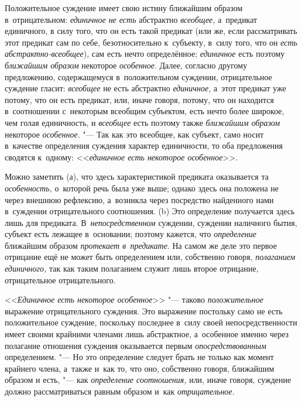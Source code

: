 Положительное суждение имеет свою истину ближайшим образом в~отрицательном:
{\em единичное не есть} абстрактно {\em всеобщее,} а~предикат единичного, в
силу того, что он есть такой предикат (или же, если рассматривать этот предикат
сам по себе, безотносительно к~субъекту, в~силу того, что он
{\em есть абстрактно-всеобщее}), сам есть нечто определённое; {\em единичное}
есть поэтому {\em ближайшим образом} некоторое {\em особенное}. Далее, согласно
другому предложению, содержащемуся в~положительном суждении, отрицательное
суждение гласит: {\em всеобщее} не есть абстрактно {\em единичное,} а~этот
предикат уже потому, что он есть предикат, или, иначе говоря, потому, что он
находится в~соотношении с~некоторым всеобщим субъектом, есть нечто более
широкое, чем голая единичность, и {\em всеобщее} есть поэтому также
{\em ближайшим образом} некоторое {\em особенное}. "--- Так как это всеобщее,
как субъект, само носит в~качестве определения суждения характер единичности,
то оба предложения сводятся к~одному:
<<{\em единичное есть некоторое особенное}>>.

Можно заметить (а), что здесь характеристикой предиката оказывается та
{\em особенность,} о~которой речь была уже выше; однако здесь она положена не через
внешнюю рефлексию, а~возникла через посредство найденного нами в~суждении
отрицательного соотношения. (b) Это определение получается здесь лишь для
предиката. В~{\em непосредственном} суждении, суждении наличного бытия,
субъект есть лежащее в~основании; поэтому кажется, что {\em определение}
ближайшим образом {\em протекает в~предикате}. На самом же деле это первое
отрицание ещё не может быть определением или, собственно говоря,
{\em полаганием единичного,} так как таким полаганием служит лишь второе
отрицание, отрицательное отрицательного.

<<{\em Единичное есть некоторое особенное}>> "--- таково {\em положительное}
выражение отрицательного суждения. Это выражение постольку само не есть
положительное суждение, поскольку последнее в~силу своей непосредственности
имеет своими крайними членами лишь абстрактное, а~особенное именно через
полагание отношения суждения оказывается первым {\em опосредствованным}
определением. "--- Но это определение следует брать не только как момент
крайнего члена, а~также и~как то, что оно, собственно говоря, ближайшим образом
и есть, "--- как {\em определение соотношения,} или, иначе говоря, суждение
должно рассматриваться равным образом и~как {\em отрицательное}.

